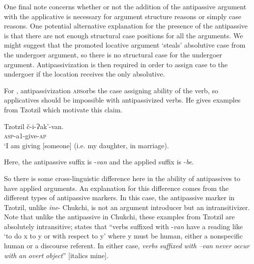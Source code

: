 \documentclass[output=paper,colorlinks,citecolor=brown,nonflat]{./langscibook}
\begin{document}
One final note concerns whether or not the addition of the antipassive argument with the applicative is necessary for argument structure reasons or simply case reasons. One potential alternative explanation for the presence of the antipassive is that there are not enough structural case positions for all the arguments. We might suggest that the promoted locative argument ‘steals’ absolutive case from the undergoer argument, so there is no structural case for the undergoer argument. Antipassivization is then required in order to assign case to the undergoer if the location receives the only absolutive. 

For \citet{Baker1988}, antipassivization \textsc{abs}orbs the case assigning ability of the verb, so applicatives should be impossible with antipassivized verbs. He gives examples from Tzotzil which motivate this claim.\textstyleEndnoteSymbol{} 

\ea%
    Tzotzil \citep{Aissen1983} \label{ex:basilico:15}
    \ea \label{ex:basilico:15a}
    \gll č-i-Ɂak’-van.\\
    \textsc{asp}{}-a1-give{}-\textsc{ap}\\
    \glt `I am giving [someone] (i.e. my daughter, in marriage).
    
    \z
    \z
    

Here, the antipassive suffix is -\textit{van} and the applied suffix is -\textit{be}.

So there is some cross-linguistic difference here in the ability of antipassives to have applied arguments. An explanation for this difference comes from the different types of antipassive markers. In this case, the antipassive marker in Tzotzil, unlike \textit{ine}{}- Chukchi, is not an argument introducer but an intransitivizer. Note that unlike the antipassive in Chukchi, these examples from Tzotzil are absolutely intransitive; \citet[291]{Aissen1983} states that “verbs suffixed with -\textit{van} have a reading like ‘to do x to y or with respect to y’ where y must be human, either a nonspecific human or a discourse referent. In either case, \textit{verbs} \textit{suffixed} \textit{with} \textit{–van} \textit{never} \textit{occur} \textit{with} \textit{an} \textit{overt} \textit{object}” [italics mine].
\end{document}

